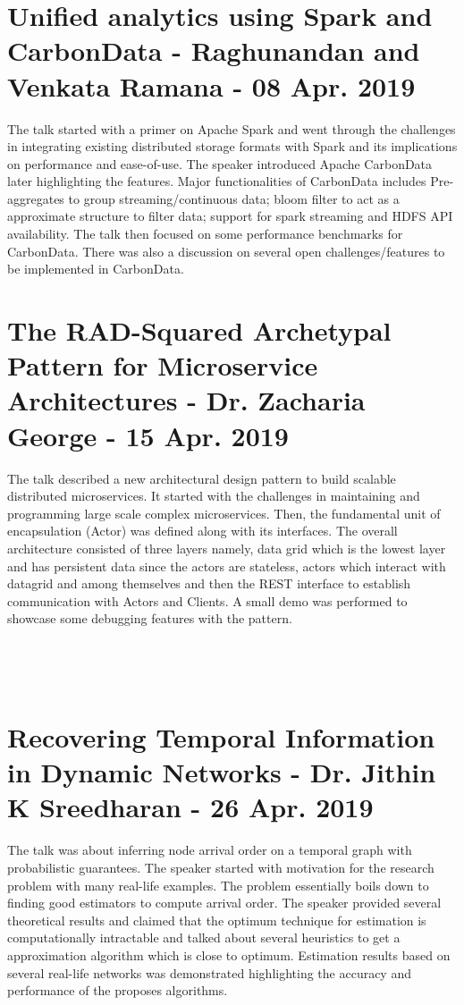 \documentclass[11pt,a4paper,oneside]{article}
\begin{document}
	\section{Unified analytics using Spark and CarbonData - Raghunandan and Venkata Ramana - 08 Apr. 2019}
	
	The talk started with a primer on Apache Spark and went through the challenges in integrating existing distributed storage formats with Spark and its implications on performance and ease-of-use. The speaker introduced Apache CarbonData later highlighting the features. Major functionalities of CarbonData includes Pre-aggregates to group streaming/continuous data; bloom filter to act as a approximate structure to filter data; support for spark streaming and HDFS API availability. The talk then focused on some performance benchmarks for CarbonData. There was also a discussion on several open challenges/features to be implemented in CarbonData. 
	
	\section{The RAD-Squared Archetypal Pattern for Microservice Architectures - Dr. Zacharia George - 15 Apr. 2019}
	
	The talk described a new architectural design pattern to build scalable distributed microservices. It started with the challenges in maintaining and programming large scale complex microservices. Then, the fundamental unit of encapsulation (Actor) was defined along with its interfaces. The overall architecture consisted of three layers namely, data grid which is the lowest layer and has persistent data since the actors are stateless, actors which interact with datagrid and among themselves and then the REST interface to establish communication with Actors and Clients. A small demo was performed to showcase some debugging features with the pattern.
	
	\begin{verbatim}
	
	
	
	\end{verbatim}
	
	\section{Recovering Temporal Information in Dynamic Networks - Dr. Jithin K Sreedharan - 26 Apr. 2019}
	
	The talk was about inferring node arrival order on a temporal graph with probabilistic guarantees. The speaker started with motivation for the research problem with many real-life examples. The problem essentially boils down to finding good estimators to compute arrival order. The speaker provided several theoretical results and claimed that the optimum technique for estimation is computationally intractable and talked about several heuristics to get a approximation algorithm which is close to optimum. Estimation results based on several real-life networks was demonstrated highlighting the accuracy and performance of the proposes algorithms. 
	
    
\end{document}
